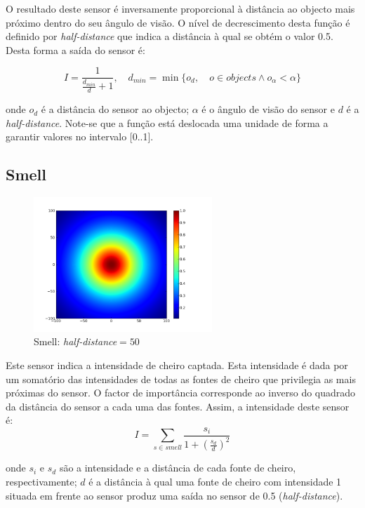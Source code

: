 \documentclass[a4paper]{article}
\begin{document}
\indent O resultado deste sensor é inversamente proporcional à distância ao objecto mais próximo dentro do seu ângulo de visão.
O nível de decrescimento desta função é definido por \emph{half-distance} que indica a distância à qual se obtém o valor 0.5.
Desta forma a saída do sensor é:

\[
	I = \frac{1}{\frac{d_{min}}{d}+1},\quad d_{min} = \min\{o_{d},\quad o \in objects \land o_{\alpha} < \alpha\}
\]

onde $o_{d}$ é a distância do sensor ao objecto; $\alpha$ é o ângulo de visão do sensor e $d$ é a \emph{half-distance}.
Note-se que a função está deslocada uma unidade de forma a garantir valores no intervalo [0..1].

\cleardoublepage
\subsection{Smell}
\begin{figure}[h]
	\vspace{-20pt}
	\begin{center}
		\includegraphics[width=0.6\textwidth]{graphs/sensors/smell.png}
	\end{center}
	\vspace{-20pt}
	\caption{Smell: \emph{half-distance}$=50$}
\end{figure}

\indent Este sensor indica a intensidade de cheiro captada. Esta intensidade é dada por um somatório das intensidades de todas as fontes de cheiro que privilegia as mais próximas do sensor. O factor de importância corresponde ao inverso do quadrado da distância do sensor a cada uma das fontes.
Assim, a intensidade deste sensor é:
\[
	I = \displaystyle\sum\limits_{s \in smell} \frac{s_{i}}{1 + (\frac{s_{d}}{d})^{2}}
\] 

onde $s_{i}$ e $s_{d}$ são a intensidade e a distância de cada fonte de cheiro, respectivamente; $d$ é a distância à qual uma fonte de cheiro com intensidade 1 situada em frente ao sensor produz uma saída no sensor de 0.5 (\emph{half-distance}).
\end{document}
